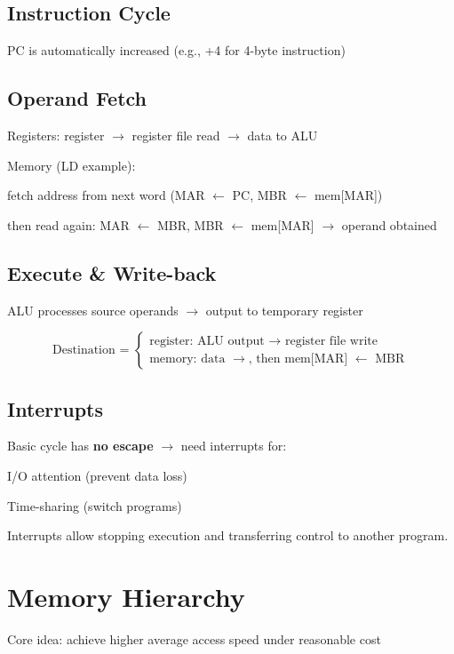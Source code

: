 \documentclass[11pt,a4paper]{article}
\begin{document}
\subsection{Instruction Cycle}
PC is automatically increased (e.g., +4 for 4-byte instruction) 

\subsection{Operand Fetch}
Registers: register $\rightarrow$ register file read $\rightarrow$ data to ALU \par
Memory (LD example): \par
\quad fetch address from next word (MAR $\leftarrow$ PC, MBR $\leftarrow$ mem[MAR]) \par
\quad then read again: MAR $\leftarrow$ MBR, MBR $\leftarrow$ mem[MAR] $\rightarrow$ operand obtained \par

\subsection{Execute \& Write-back}
ALU processes source operands $\rightarrow$ output to temporary register \par
\[ 
\text{Destination = }
\begin{cases}
    \text{register: ALU output $\rightarrow$ register file write} \\
    \text{memory: data $\rightarrow$, then mem[MAR] $\leftarrow$ MBR}
\end{cases}
\]

\subsection{Interrupts}
Basic cycle has \textbf{no escape} $\rightarrow$ need interrupts for: \par
\quad I/O attention (prevent data loss) \par
\quad Time-sharing (switch programs) \par
Interrupts allow stopping execution and transferring control to another program. \par

\section{Memory Hierarchy}
Core idea: achieve higher average access speed under reasonable cost \par
{}
\end{document}
